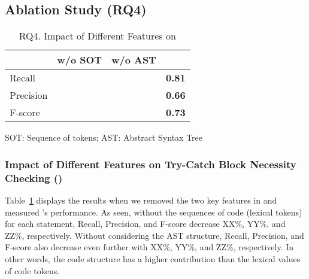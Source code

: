 \subsection{Ablation Study (RQ4)}
\label{sec:rq4}



\begin{table}[t]
  \caption{RQ4. Impact of Different Features on {\xblock}}
  \vspace{-12pt}
  \begin{center}
    \small
		\renewcommand{\arraystretch}{1}
		\begin{tabular}{p{1.75cm}<{\centering}|p{1.75cm}<{\centering}|p{1.75cm}<{\centering}|p{1.75cm}<{\centering}}
			\hline
			  & \tool w/o SOT & \tool w/o AST & \tool \\
			\hline
			Recall    & & & \textbf{0.81} \\
			Precision & & &\textbf{0.66} \\
			F-score   & & &\textbf{0.73} \\
			\hline
		\end{tabular}
		SOT: Sequence of tokens; AST: Abstract Syntax Tree
		\label{tab:sensi-xblock}
	\end{center}
\end{table}

\subsubsection{Impact of Different Features on Try-Catch Block Necessity Checking ({\xblock})}

Table~\ref{tab:sensi-xblock} displays the results when we removed the
two key features in {\tool} and measured {\xblock}'s performance. As
seen, without the sequences of code (lexical tokens) for each
statement, Recall, Precision, and F-score decrease XX\%, YY\%, and
ZZ\%, respectively. Without considering the AST structure, Recall,
Precision, and F-score also decrease even further with XX\%, YY\%, and
ZZ\%, respectively. In other words, the code structure has a higher
contribution than the lexical values of code tokens.



